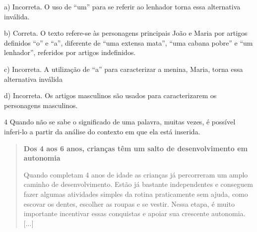 \begin{escolha}


a)  Incorreta. O uso de ``um'' para se referir ao lenhador torna essa
alternativa inválida.

b)  Correta. O texto refere-se às personagens principais João e Maria
por artigos definidos ``o'' e ``a'', diferente de ``uma extensa mata'',
``uma cabana pobre'' e ``um lenhador'', referidos por artigos indefinidos.

c)  Incorreta. A utilização de ``a'' para caracterizar a menina, Maria,
torna essa alternativa inválida

d)  Incorreta. Os artigos masculinos são usados para caracterizarem os
personagens masculinos.

\num{4} Quando não se sabe o significado de uma palavra, muitas vezes, é
possível inferi-lo a partir da análise do contexto em que ela está
inserida.

\begin{quote}
\textbf{Dos 4 aos 6 anos, crianças têm um salto de desenvolvimento em autonomia}

Quando completam 4 anos de idade as crianças já percorreram um amplo
caminho de desenvolvimento. Estão já bastante independentes e conseguem
fazer algumas atividades simples da rotina praticamente sem ajuda, como
escovar os dentes, escolher as roupas e se vestir. Nessa etapa, é muito
importante incentivar essas conquistas e apoiar sua crescente autonomia.
{[}...{]}


\end{quote}
\end{escolha}
